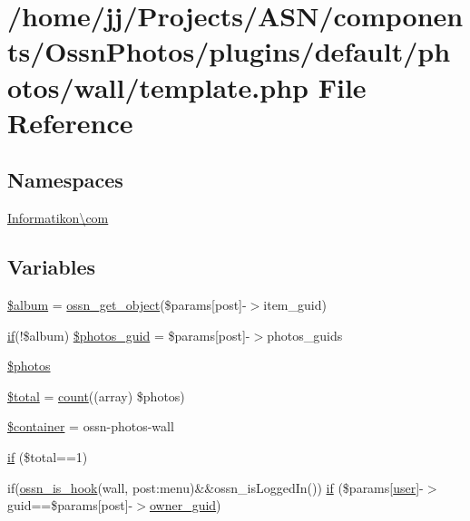 \hypertarget{template_8php}{}\section{/home/jj/\+Projects/\+A\+S\+N/components/\+Ossn\+Photos/plugins/default/photos/wall/template.php File Reference}
\label{template_8php}
\subsection*{Namespaces}
\begin{DoxyCompactItemize}
\item 
 \hyperlink{namespace_informatikon_1_1com}{Informatikon\textbackslash{}com}
\end{DoxyCompactItemize}
\subsection*{Variables}
\begin{DoxyCompactItemize}
\item 
\hyperlink{template_8php_ac40a9764673b6d86593dc674331c5116}{\$album} = \hyperlink{ossn_8lib_8objects_8php_a6b5970320e8ed1af1b6f863e7ad51f01}{ossn\+\_\+get\+\_\+object}(\$params\mbox{[}\textquotesingle{}post\textquotesingle{}\mbox{]}-\/$>$item\+\_\+guid)
\item 
\hyperlink{jquery_8tokeninput_8js_ad8dd46a3cbc004569e34401e9e71771a}{if}(!\$album) \hyperlink{template_8php_ac5b889be5aaba96358f3eb8ac72c21bf}{\$photos\+\_\+guid} = \$params\mbox{[}\textquotesingle{}post\textquotesingle{}\mbox{]}-\/$>$photos\+\_\+guids
\item 
\hyperlink{template_8php_a7d16539c7a3688bee1d3184c81c47487}{\$photos}
\item 
\hyperlink{template_8php_a241b818f48030b628685b2e5119c5624}{\$total} = \hyperlink{photos_2pages_2photos_8php_a364678aa3bd05301b3d1b8650653cf48}{count}((array) \$photos)
\item 
\hyperlink{template_8php_ab97dd40df90f4ce6f0fce9091e7c7872}{\$container} = \textquotesingle{}ossn-\/photos-\/wall\textquotesingle{}
\item 
\hyperlink{template_8php_adc75a6541acf09bfbf09a8105cd84624}{if} (\$total==1)
\item 
if(\hyperlink{ossn_8lib_8system_8php_ae29c30c131d7600928d7a2fc28bcd322}{ossn\+\_\+is\+\_\+hook}(\textquotesingle{}wall\textquotesingle{}, \textquotesingle{}post\+:menu\textquotesingle{})\&\&ossn\+\_\+is\+Logged\+In()) \hyperlink{template_8php_a01283bd6df56fa280ea988dfb8dbbfaf}{if} (\$params\mbox{[}\textquotesingle{}\hyperlink{ossn_8config_8db_8example_8php_a802544b7ba9f79bbf24ef67773d53bed}{user}\textquotesingle{}\mbox{]}-\/$>$guid==\$params\mbox{[}\textquotesingle{}post\textquotesingle{}\mbox{]}-\/$>$\hyperlink{user_8php_a307051fefc937afd02c509c55646f50b}{owner\+\_\+guid})
\end{DoxyCompactItemize}


